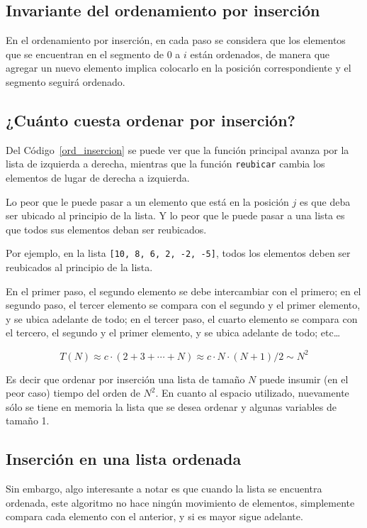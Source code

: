 \subsection{Invariante del ordenamiento por inserción}

En el ordenamiento por inserción, en cada paso se considera que los
elementos que se encuentran en el segmento de $0$ a $i$ están ordenados, de
manera que agregar un nuevo elemento implica colocarlo en la posición
correspondiente y el segmento seguirá ordenado.

\subsection{¿Cuánto cuesta ordenar por inserción?}

Del Código~\ref{ord_insercion} se puede ver que la función principal avanza por la
lista de izquierda a derecha, mientras que la función \lstinline!reubicar!
cambia los elementos de lugar de derecha a izquierda.

Lo peor que le puede pasar a un elemento que está en la posición
$j$ es que deba ser ubicado al principio de la lista.  Y lo peor que le
puede pasar a una lista es que todos sus elementos deban ser reubicados.

Por ejemplo, en la lista \lstinline+[10, 8, 6, 2, -2, -5]+, todos los
elementos deben ser reubicados al principio de la lista.

En el primer paso, el segundo elemento se debe intercambiar con el primero;
en el segundo paso, el tercer elemento se compara con el segundo y el
primer elemento, y se ubica adelante de todo; en el tercer paso, el cuarto
elemento se compara con el tercero, el segundo y el primer elemento, y se
ubica adelante de todo; etc\ldots

$$ T(N) \approx c \cdot (2 + 3 + \cdots + N) \approx c \cdot N \cdot (N+1)/2 \sim N^2 $$

Es decir que ordenar por inserción una lista de tamaño $N$ puede insumir
(en el peor caso) tiempo del orden de $N^2$. En cuanto al espacio
utilizado, nuevamente sólo se tiene en memoria la lista que se desea
ordenar y algunas variables de tamaño 1.

\subsection{Inserción en una lista ordenada}

Sin embargo, algo interesante a notar es que cuando la lista se encuentra
ordenada, este algoritmo no hace ningún movimiento de elementos,
simplemente compara cada elemento con el anterior, y si es mayor sigue
adelante.

